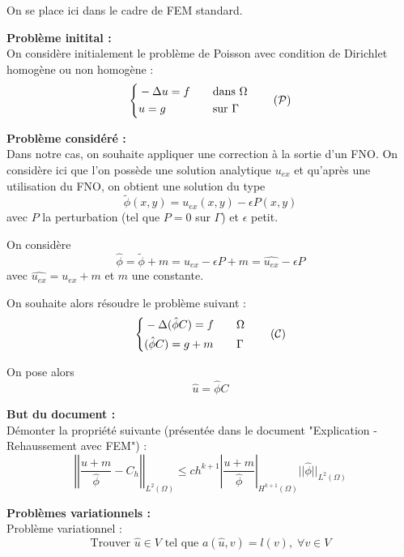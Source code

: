 On se place ici dans le cadre de FEM standard. 

\textbf{Problème initital :} \\
On considère initialement le problème de Poisson avec condition de Dirichlet homogène ou non homogène :
\begin{equation}
	\left\{\begin{aligned}
		&-\Delta u=f \quad &&\text{dans } \Omega \\
		&u=g \quad &&\text{sur } \Gamma
	\end{aligned}\right. \label{pb_initial} \tag{$\mathcal{P}$}
\end{equation}

\textbf{Problème considéré :} \\
Dans notre cas, on souhaite appliquer une correction à la sortie d'un FNO.
On considère ici que l'on possède une solution analytique $u_{ex}$ et qu'après une utilisation du FNO, on obtient une solution du type
$$\tilde{\phi}(x,y) = u_{ex}(x,y)-\epsilon P(x,y)$$
avec $P$ la perturbation (tel que $P=0$ sur $\Gamma$) et $\epsilon$ petit.

On considère
$$\hat{\phi}=\tilde{\phi}+m=u_{ex}-\epsilon P+m=\widehat{u_{ex}}-\epsilon P$$
avec $\widehat{u_{ex}}=u_{ex}+m$ et $m$ une constante.

On souhaite alors résoudre le problème suivant :
\begin{equation}
	\left\{\begin{aligned}
		&-\Delta (\hat{\phi}C)=f \quad &&\Omega \\
		&(\hat{\phi}C)=g+m \quad &&\Gamma
	\end{aligned}\right. \label{pb_reh} \tag{$\mathcal{C}$}
\end{equation}

On pose alors
$$\hat{u}=\hat{\phi}C$$

\textbf{But du document :} \\
Démonter la propriété suivante (présentée dans le document "Explication - Rehaussement avec FEM") :
\begin{equation}
	\left|\left|\frac{u+m}{\hat{\phi}}-C_h\right|\right|_{L^2(\Omega)}\le ch^{k+1}\left|\frac{u+m}{\hat{\phi}}\right|_{H^{k+1}(\Omega)}||\hat{\phi}||_{L^2(\Omega)}
	\label{ine_a_dem}
\end{equation}

\textbf{Problèmes variationnels :} \\

Problème variationnel :
$$\text{Trouver } \hat{u}\in V \text{ tel que } a(\hat{u},v)=l(v), \;\forall v\in V$$

